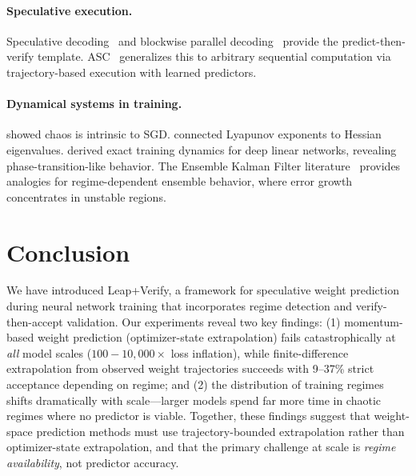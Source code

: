 \documentclass{article}
\begin{document}
\paragraph{Speculative execution.}
Speculative decoding~\citep{leviathan2023fast,chen2023accelerating} and blockwise parallel decoding~\citep{stern2018blockwise} provide the predict-then-verify template.
ASC~\citep{waterland2014asc,waterland2013computational} generalizes this to arbitrary sequential computation via trajectory-based execution with learned predictors.

\paragraph{Dynamical systems in training.}
\citet{geiger2022chaotic} showed chaos is intrinsic to SGD.
\citet{tajanthan2022chaos} connected Lyapunov exponents to Hessian eigenvalues.
\citet{saxe2014exact} derived exact training dynamics for deep linear networks, revealing phase-transition-like behavior.
The Ensemble Kalman Filter literature~\citep{evensen1994sequential,gao2011assimilation} provides analogies for regime-dependent ensemble behavior, where error growth concentrates in unstable regions.

\section{Conclusion}
\label{sec:conclusion}

We have introduced Leap+Verify, a framework for speculative weight prediction during neural network training that incorporates regime detection and verify-then-accept validation.
Our experiments reveal two key findings: (1) momentum-based weight prediction (optimizer-state extrapolation) fails catastrophically at \emph{all} model scales ($100{-}10{,}000\times$ loss inflation), while finite-difference extrapolation from observed weight trajectories succeeds with 9--37\% strict acceptance depending on regime; and (2) the distribution of training regimes shifts dramatically with scale---larger models spend far more time in chaotic regimes where no predictor is viable.
Together, these findings suggest that weight-space prediction methods must use trajectory-bounded extrapolation rather than optimizer-state extrapolation, and that the primary challenge at scale is \emph{regime availability}, not predictor accuracy.
\end{document}
